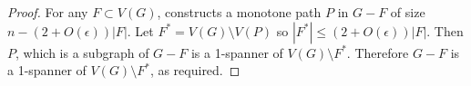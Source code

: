\documentclass{patmorin}
\begin{document}
\begin{proof}
	For any $F\subset V(G)$,  constructs a monotone path $P$ in $G-F$ of size $n-(2+O(\epsilon))|F|$.  Let $F^*=V(G)\setminus V(P)$ so $|F^*|\le (2+O(\epsilon))|F|$.  Then $P$, which is a subgraph of $G-F$ is a 1-spanner of $V(G)\setminus F^*$. Therefore $G-F$ is a 1-spanner of $V(G)\setminus F^*$, as required.
\end{proof}
%  
%  
%
%	
%	
%	
%	
%		  
%		  
%		  
%	
%	
%	
%
%  
%  
%
%
\end{document}
